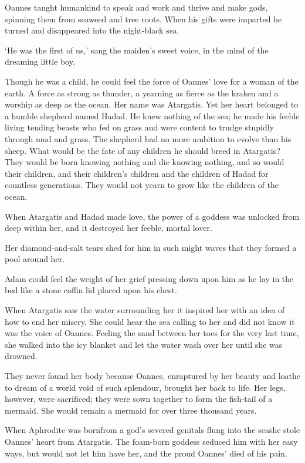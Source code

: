 Oannes taught humankind to speak and work and thrive and make gods,
spinning them from seaweed and tree roots. When his gifts were
imparted he turned and disappeared into the night-black sea.

`He was the first of us,' sang the maiden’s sweet voice, in the mind
of the dreaming little boy.

Though he was a child, he could feel the force of Oannes’ love for a
woman of the earth. %
A force as strong as thunder, a yearning as fierce as
the kraken and a worship as deep as the ocean. Her name was
Atargatis. Yet her heart belonged to a humble shepherd named
Hadad. He knew nothing of the sea; he made his feeble living tending
beasts who fed on grass and were content to trudge stupidly through
mud and grass. The shepherd had no more ambition to evolve than his
sheep. What would be the fate of any children he should breed in
Atargatis? They would be born knowing nothing and die knowing nothing,
and so would their children, and their children’s children and the
children of Hadad for countless generations. They would not yearn to
grow like the children of the ocean.

When Atargatis and Hadad made love, the power of a goddess %
was unlocked from deep within her, and it destroyed her feeble, mortal
lover.

Her diamond-and-salt tears shed for him in such might waves that they
formed a pool around her.

Adam could feel the weight of her grief pressing down upon him as he
lay in the bed like a stone coffin lid placed upon his chest.

When Atargatis saw the water surrounding her it inspired her with an
idea of how to end her misery. She could hear the sea calling to her
and did not know it was the voice of Oannes. Feeling the sand between
her toes for the very last time, she walked into the icy blanket and
let the water wash over her until she was drowned.

They never found her body because Oannes, enraptured by her beauty and
loathe to dream of a world void of such splendour, brought her back to
life. Her legs, however, were sacrificed; they were sown together to
form the fish-tail of a mermaid. She would remain a mermaid for over
three thousand years.

When Aphrodite was born\=from a god’s severed genitals flung into the
sea\=she stole Oannes’ heart from Atargatis. The foam-born goddess
seduced him with her easy ways, but would not let him have her, and
the proud Oannes’ died of his pain.

